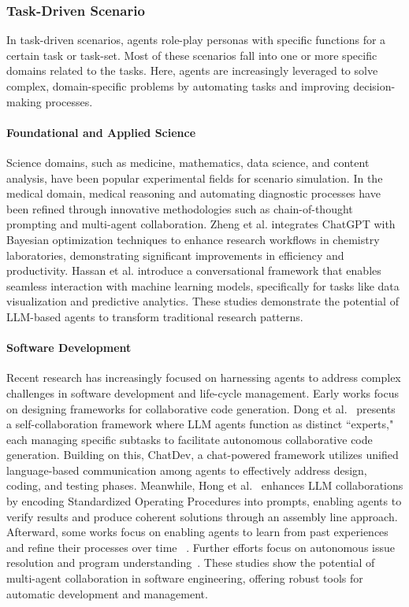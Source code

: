 \subsubsection{Task-Driven Scenario}
In task-driven scenarios, agents role-play personas with specific functions for a certain task or task-set.
Most of these scenarios fall into one or more specific domains related to the tasks.
Here, agents are increasingly leveraged to solve complex, domain-specific problems by automating tasks and improving decision-making processes.

\paragraph{Foundational and Applied Science}
Science domains, such as medicine, mathematics, data science, and content analysis, have been popular experimental fields for scenario simulation. In the medical domain, medical reasoning and automating diagnostic processes have been refined through innovative methodologies such as chain-of-thought prompting and multi-agent collaboration\cite{wu2023large,tang2023medagents,li2024agent,bao2024piors}.
Zheng et al.\cite{zheng2023chatgpt} integrates ChatGPT with Bayesian optimization techniques to enhance research workflows in chemistry laboratories, demonstrating significant improvements in efficiency and productivity. Hassan et al.\cite{hassan2023chatgpt} introduce a conversational framework that enables seamless interaction with machine learning models, specifically for tasks like data visualization and predictive analytics. These studies demonstrate the potential of LLM-based agents to transform traditional research patterns.

\paragraph{Software Development}
Recent research has increasingly focused on harnessing agents to address complex challenges in software development and life-cycle management. Early works focus on designing frameworks for collaborative code generation. Dong et al.~\cite{dong2023self} presents a self-collaboration framework where LLM agents function as distinct ``experts," each managing specific subtasks to facilitate autonomous collaborative code generation. Building on this, ChatDev\cite{qian2024chatdev}, a chat-powered framework utilizes unified language-based communication among agents to effectively address design, coding, and testing phases. Meanwhile, Hong et al.~\cite{hong2023metagpt} enhances LLM collaborations by encoding Standardized Operating Procedures into prompts, enabling agents to verify results and produce coherent solutions through an assembly line approach. Afterward, some works focus on enabling agents to learn from past experiences and refine their processes over time
~\cite{qian2023experiential,qian2024iterative}. Further efforts focus on autonomous issue resolution and program understanding~\cite{zhang2024autocoderover}. These studies show the potential of multi-agent collaboration in software engineering, offering robust tools for automatic development and management.


